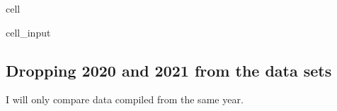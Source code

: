 \documentclass[letterpaper,10pt,english]{jupyterBook}
\begin{document}
\begin{sphinxuseclass}{cell}\begin{sphinxVerbatimInput}

\begin{sphinxuseclass}{cell_input}
\begin{sphinxVerbatim}[commandchars=\\\{\}]
      
\end{sphinxVerbatim}

\end{sphinxuseclass}\end{sphinxVerbatimInput}

\end{sphinxuseclass}

\subsection{Dropping 2020 and 2021 from the data sets}
\label{\detokenize{notebooks/data_exploration:dropping-2020-and-2021-from-the-data-sets}}
\sphinxAtStartPar
I will only compare data compiled from the same year.
\end{document}

